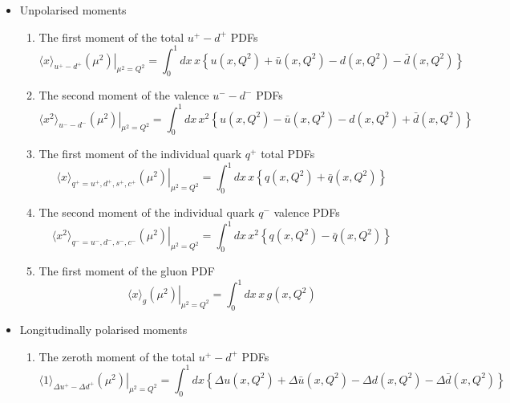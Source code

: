 \begin{itemize}

\item Unpolarised moments

\begin{enumerate}

\item The first moment of the total $u^+-d^+$ PDFs
\begin{equation}
\left.\langle x\rangle_{u^+-d^+}(\mu^2)\right|_{\mu^2=Q^2}
=
\int_0^1 dx\, x\left\{u(x,Q^2)+\bar{u}(x,Q^2)-d(x,Q^2)-\bar{d}(x,Q^2)\right\}
\label{eq:unpfmumdtot}
\end{equation}

\item The second moment of the valence $u^--d^-$ PDFs
\begin{equation}
\left.\langle x^2\rangle_{u^--d^-}(\mu^2)\right|_{\mu^2=Q^2}
=
\int_0^1 dx\, x^2\left\{u(x,Q^2)-\bar{u}(x,Q^2)-d(x,Q^2)+\bar{d}(x,Q^2)\right\}
\label{eq:unpsmumdval}  
\end{equation}

\item The first moment of the individual quark $q^+$ total PDFs
\begin{equation}
\left.\langle x\rangle_{q^+=u^+,d^+,s^+,c^+}(\mu^2)\right|_{\mu^2=Q^2}
=
\int_0^1 dx\, x\left\{q(x,Q^2)+\bar{q}(x,Q^2)\right\}
\label{eq:unpfmiqtot}
\end{equation}

\item The second moment of the individual quark $q^-$ valence PDFs
\begin{equation}
\left.\langle x^2\rangle_{q^-=u^-,d^-,s^-,c^-}(\mu^2)\right|_{\mu^2=Q^2}
=
\int_0^1 dx\, x^2\left\{q(x,Q^2)-\bar{q}(x,Q^2)\right\}
\label{eq:unpsmiqval}
\end{equation}

\item The first moment of the gluon PDF
\begin{equation}
\left.\langle x \rangle_g(\mu^2)\right|_{\mu^2=Q^2}
=
\int_0^1 dx\, x\, g(x,Q^2)
\label{eq:unpfmg}
\end{equation}

\end{enumerate}


\item Longitudinally polarised moments

\begin{enumerate}

\item The zeroth moment of the total $u^+-d^+$ PDFs
\begin{equation}
\left.\langle 1 \rangle_{\Delta u^+-\Delta d^+}(\mu^2)\right|_{\mu^2=Q^2}
=
\int_0^1 dx \left\{\Delta u(x,Q^2)+\Delta\bar{u}(x,Q^2)-\Delta d(x,Q^2)-\Delta\bar{d}(x,Q^2)\right\}
\label{eq:polzmumdtot}
\end{equation}


\end{enumerate}
\end{itemize}
